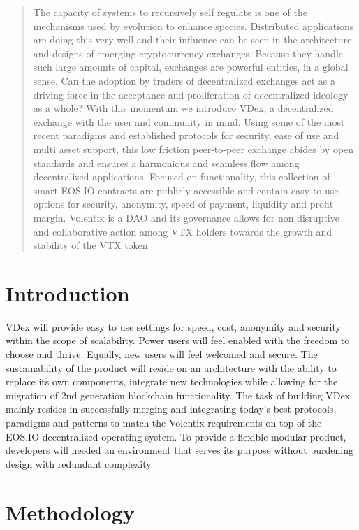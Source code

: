 \documentclass[]{article}
\begin{document}
\begin{abstract}
The capacity of systems to recursively self regulate is one of the mechanisms used by evolution to enhance species. Distributed applications are doing this very well and their influence can be seen in the architecture
and designs of emerging cryptocurrency exchanges. Because they handle such large amounts of capital, exchanges are powerful entities, in a global sense. 
Can the adoption by traders of decentralized exchanges act as a driving force in the acceptance and proliferation of decentralized ideology as a whole? 
With this momentum we introduce VDex, a decentralized exchange 
with the user and community in mind. Using some of the most recent paradigms 
and established protocols for security, ease of use and multi asset support, 
this low friction peer-to-peer exchange abides by open standards and ensures 
a harmonious and seamless flow among decentralized applications. 
Focused on functionality, this collection of smart EOS.IO contracts are 
publicly accessible and contain easy to use options for security, anonymity, 
speed of payment, liquidity and profit margin.
Volentix is a DAO and its governance allows for non disruptive and collaborative action among VTX holders towards the growth and stability of the VTX token.
\end{abstract}
\section{Introduction}

VDex will provide easy to use settings for speed, cost, anonymity and security within the scope of scalability. Power users will feel enabled with the freedom to choose and thrive. Equally, new users will feel welcomed and secure.
The sustainability of the product will reside on an architecture 
with the ability to replace its own components, integrate new technologies while allowing for the migration of 2nd generation blockchain functionality.  
The task of building VDex mainly resides in successfully merging
and integrating today's best protocols, paradigms and patterns to match the 
Volentix requirements on top of the EOS.IO decentralized operating system.
To provide a flexible modular product, developers will needed an environment that serves its purpose without burdening design with redundant complexity. 
 	
\section{Methodology}
\end{document}
